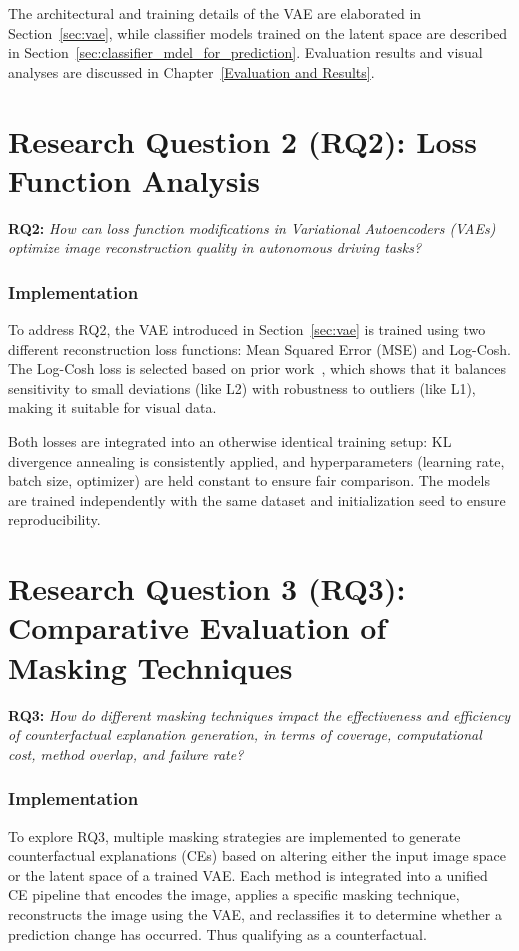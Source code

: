 The architectural and training details of the VAE are elaborated in Section~\ref{sec:vae}, while classifier models trained on the latent space are described in Section~\ref{sec:classifier_mdel_for_prediction}. Evaluation results and visual analyses are discussed in Chapter~\ref{Evaluation and Results}.

\vspace{1em}
\section*{Research Question 2 (RQ2): Loss Function Analysis}

\textbf{RQ2:} \textit{How can loss function modifications in Variational Autoencoders (VAEs) optimize image reconstruction quality in autonomous driving tasks?}

\subsubsection*{Implementation} 
    To address RQ2, the VAE introduced in Section~\ref{sec:vae} is trained using two different reconstruction loss functions: Mean Squared Error (MSE) and Log-Cosh. The Log-Cosh loss is selected based on prior work~\cite{chen2019log}, which shows that it balances sensitivity to small deviations (like L2) with robustness to outliers (like L1), making it suitable for visual data.
        
    Both losses are integrated into an otherwise identical training setup: KL divergence annealing is consistently applied, and hyperparameters (learning rate, batch size, optimizer) are held constant to ensure fair comparison. The models are trained independently with the same dataset and initialization seed to ensure reproducibility.


\vspace{1em}
\section*{Research Question 3 (RQ3): Comparative Evaluation of Masking Techniques}

\textbf{RQ3:} \textit{How do different masking techniques impact the effectiveness and efficiency of counterfactual explanation generation, in terms of coverage, computational cost, method overlap, and failure rate?}

\subsubsection*{Implementation}
    To explore RQ3, multiple masking strategies are implemented to generate counterfactual explanations (CEs) based on altering either the input image space or the latent space of a trained VAE. Each method is integrated into a unified CE pipeline that encodes the image, applies a specific masking technique, reconstructs the image using the VAE, and reclassifies it to determine whether a prediction change has occurred. Thus qualifying as a counterfactual.





